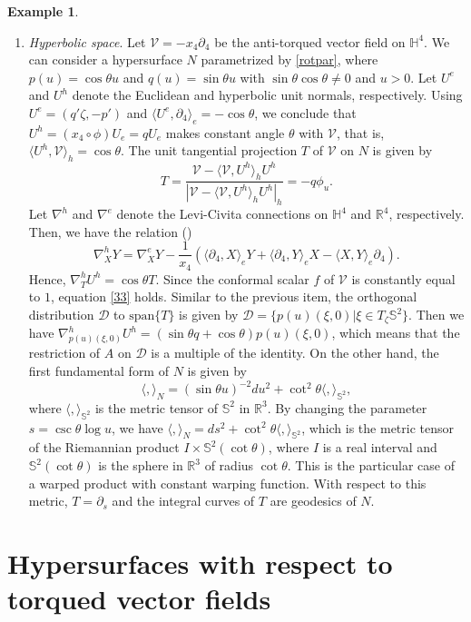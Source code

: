 \documentclass[12pt]{amsart}
\def\r{\mathbb R}
\def\s{\mathbb S}
\def\h{\mathbb H}
\def\v{\mathcal V}
\theoremstyle{definition}
\newtheorem{example}[theorem]{Example}
\begin{document}
\begin{example}
\begin{enumerate}
\item {\it Hyperbolic space}. Let $\v=-x_4\partial_4$ be the anti-torqued vector field on $\h^4$. We can consider a hypersurface $N$ parametrized by \eqref{rotpar}, where $p(u)=\cos\theta u$ and $q(u)=\sin\theta u$ with $\sin \theta \cos \theta\neq 0$ and $u>0$. Let $U^e$ and $U^h$ denote the Euclidean and hyperbolic unit normals, respectively. Using $U^e=(q'\zeta,-p')$ and $\langle U^e,\partial_4 \rangle_e =-\cos\theta $, we conclude that $U^h=(x_4\circ \phi)U_e=qU_e$ makes constant angle $\theta$ with $\v$, that is, $\langle U^h,\v \rangle_h =\cos\theta $. The unit tangential projection $T$ of $\v$ on $N$ is given by
$$
T=\frac{\v-\langle \v,U^h\rangle_h U^h}{|\v-\langle \v,U^h\rangle_h U^h|_h}=-q \phi_u.
$$
Let $\nabla^h$ and $\nabla^e$ denote the Levi-Civita connections on $\h^4$ and $\r^4$, respectively. Then, we have the relation (\cite{lo})
$$
\nabla^h_XY=\nabla^e_XY-\frac{1}{x_4}(\langle \partial_4,X\rangle_e Y+\langle \partial_4,Y\rangle_e X-\langle X,Y\rangle_e \partial_4).
$$
Hence, $\nabla^h_TU^h=\cos \theta T$. Since the conformal scalar $f$ of $\v$ is constantly equal to $1$, equation \eqref{33} holds. Similar to the previous item, the orthogonal distribution $\mathcal{D}$ to $\mbox{span} \{T\}$ is given by $\mathcal{D}=\{p(u)(\xi,0)|\xi \in T_\zeta\s^2\}.$ Then we have $\nabla^h_{p(u)(\xi,0)}U^h=(\sin\theta q+\cos\theta)p(u)(\xi,0)$, which means that the restriction of $A$ on $\mathcal{D}$ is a multiple of the identity. On the other hand, the first fundamental form of $N$ is given by
$$
\langle,\rangle_N=(\sin\theta u)^{-2}du^2+\cot^2\theta \langle,\rangle_{\s^2},
$$
where $\langle,\rangle_{\s^2}$ is the metric tensor of $\s^2$ in $\r^3$. By changing the parameter $s=\csc \theta \log u$, we have $\langle,\rangle_N=ds^2+\cot^2\theta \langle,\rangle_{\s^2}$, which is the metric tensor of the Riemannian product $I\times \s^2(\cot\theta)$, where $I$ is a real interval and $\s^2(\cot\theta)$ is the sphere in $\r^3$ of radius $\cot \theta$. This is the particular case of a warped product with constant warping function. With respect to this metric, $T=\partial_s$ and the integral curves of $T$ are geodesics of $N$.
\end{enumerate}
\end{example}

\section{Hypersurfaces with respect to torqued vector fields} \label{torqued}
\end{document}
